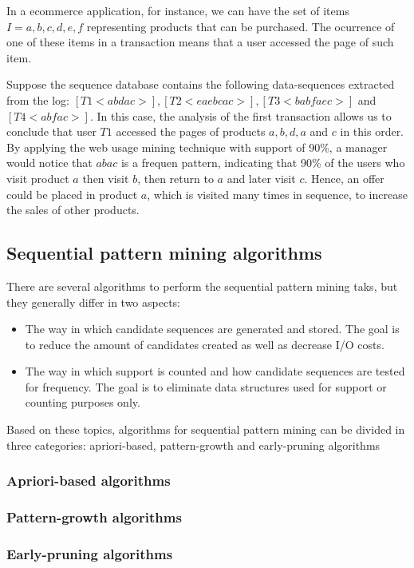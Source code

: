 In a ecommerce application, for instance, we can have the set of items $I = {a, b, c, d, e, f}$ representing products that can be purchased. The ocurrence of one of these items in a transaction means that a user accessed the page of such item.

Suppose the sequence database contains the following data-sequences extracted from the log: $[T1 <abdac>], [T2 <eaebcac>], [T3 <babfaec>]$ and $[T4 <abfac>]$. In this case, the analysis of the first transaction allows us to conclude that user $T1$ accessed the pages of products $a,b,d,a$ and $c$ in this order. By applying the web usage mining technique with support of 90\%, a manager would notice that $abac$ is a frequen pattern, indicating that 90\% of the users who visit product $a$ then visit $b$, then return to $a$ and later visit $c$. Hence, an offer could be placed in product $a$, which is visited many times in sequence, to increase the sales of other products. 


\subsection{Sequential pattern mining algorithms}

There are several algorithms to perform the sequential pattern mining taks, but they generally differ in two aspects\cite{Nizar}:

\begin{itemize}

\item The way in which candidate sequences are generated and stored. The goal is to reduce the amount of candidates created as well as decrease I/O costs.

\item The way in which support is counted and how candidate sequences are tested for frequency. The goal is to eliminate data structures used for support or counting purposes only.

\end{itemize}

Based on these topics, algorithms for sequential pattern mining can be divided in three categories: apriori-based, pattern-growth and early-pruning algorithms

\subsubsection{Apriori-based algorithms}

\subsubsection{Pattern-growth algorithms}

\subsubsection{Early-pruning algorithms}
